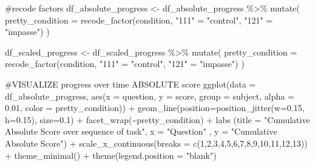 \documentclass[
  letterpaper,
  DIV=11,
  numbers=noendperiod]{scrreprt}
\newenvironment{Shaded}{\begin{snugshade}}{\end{snugshade}}
\newcommand{\AttributeTok}[1]{\textcolor[rgb]{0.40,0.45,0.13}{#1}}
\newcommand{\CommentTok}[1]{\textcolor[rgb]{0.37,0.37,0.37}{#1}}
\newcommand{\DecValTok}[1]{\textcolor[rgb]{0.68,0.00,0.00}{#1}}
\newcommand{\FloatTok}[1]{\textcolor[rgb]{0.68,0.00,0.00}{#1}}
\newcommand{\FunctionTok}[1]{\textcolor[rgb]{0.28,0.35,0.67}{#1}}
\newcommand{\NormalTok}[1]{\textcolor[rgb]{0.00,0.23,0.31}{#1}}
\newcommand{\OtherTok}[1]{\textcolor[rgb]{0.00,0.23,0.31}{#1}}
\newcommand{\SpecialCharTok}[1]{\textcolor[rgb]{0.37,0.37,0.37}{#1}}
\newcommand{\StringTok}[1]{\textcolor[rgb]{0.13,0.47,0.30}{#1}}
\begin{document}
\begin{Shaded}
\begin{Highlighting}[]
\CommentTok{\#recode factors}
\NormalTok{df\_absolute\_progress }\OtherTok{\textless{}{-}}\NormalTok{ df\_absolute\_progress }\SpecialCharTok{\%\textgreater{}\%} \FunctionTok{mutate}\NormalTok{(}
    \AttributeTok{pretty\_condition =} \FunctionTok{recode\_factor}\NormalTok{(condition, }\StringTok{"111"} \OtherTok{=} \StringTok{"control"}\NormalTok{, }\StringTok{"121"} \OtherTok{=}  \StringTok{"impasse"}\NormalTok{)}
\NormalTok{)}

\NormalTok{df\_scaled\_progress }\OtherTok{\textless{}{-}}\NormalTok{ df\_scaled\_progress }\SpecialCharTok{\%\textgreater{}\%} \FunctionTok{mutate}\NormalTok{(}
    \AttributeTok{pretty\_condition =} \FunctionTok{recode\_factor}\NormalTok{(condition, }\StringTok{"111"} \OtherTok{=} \StringTok{"control"}\NormalTok{, }\StringTok{"121"} \OtherTok{=}  \StringTok{"impasse"}\NormalTok{)}
\NormalTok{)}

\CommentTok{\#VISUALIZE progress over time ABSOLUTE score }
\FunctionTok{ggplot}\NormalTok{(}\AttributeTok{data =}\NormalTok{ df\_absolute\_progress, }\FunctionTok{aes}\NormalTok{(}\AttributeTok{x =}\NormalTok{ question, }\AttributeTok{y =}\NormalTok{ score, }\AttributeTok{group =}\NormalTok{ subject, }\AttributeTok{alpha =} \FloatTok{0.01}\NormalTok{, }\AttributeTok{color =}\NormalTok{ pretty\_condition)) }\SpecialCharTok{+} 
 \FunctionTok{geom\_line}\NormalTok{(}\AttributeTok{position=}\FunctionTok{position\_jitter}\NormalTok{(}\AttributeTok{w=}\FloatTok{0.15}\NormalTok{, }\AttributeTok{h=}\FloatTok{0.15}\NormalTok{), }\AttributeTok{size=}\FloatTok{0.1}\NormalTok{) }\SpecialCharTok{+}
 \FunctionTok{facet\_wrap}\NormalTok{(}\SpecialCharTok{\textasciitilde{}}\NormalTok{pretty\_condition) }\SpecialCharTok{+} 
 \FunctionTok{labs}\NormalTok{ (}\AttributeTok{title =} \StringTok{"Cumulative Absolute Score over sequence of task"}\NormalTok{, }\AttributeTok{x =} \StringTok{"Question"}\NormalTok{ , }\AttributeTok{y =} \StringTok{"Cumulative Absolute Score"}\NormalTok{) }\SpecialCharTok{+} 
 \FunctionTok{scale\_x\_continuous}\NormalTok{(}\AttributeTok{breaks =} \FunctionTok{c}\NormalTok{(}\DecValTok{1}\NormalTok{,}\DecValTok{2}\NormalTok{,}\DecValTok{3}\NormalTok{,}\DecValTok{4}\NormalTok{,}\DecValTok{5}\NormalTok{,}\DecValTok{6}\NormalTok{,}\DecValTok{7}\NormalTok{,}\DecValTok{8}\NormalTok{,}\DecValTok{9}\NormalTok{,}\DecValTok{10}\NormalTok{,}\DecValTok{11}\NormalTok{,}\DecValTok{12}\NormalTok{,}\DecValTok{13}\NormalTok{)) }\SpecialCharTok{+}
 \FunctionTok{theme\_minimal}\NormalTok{() }\SpecialCharTok{+} \FunctionTok{theme}\NormalTok{(}\AttributeTok{legend.position =} \StringTok{"blank"}\NormalTok{)}
\end{Highlighting}
\end{Shaded}
\end{document}
